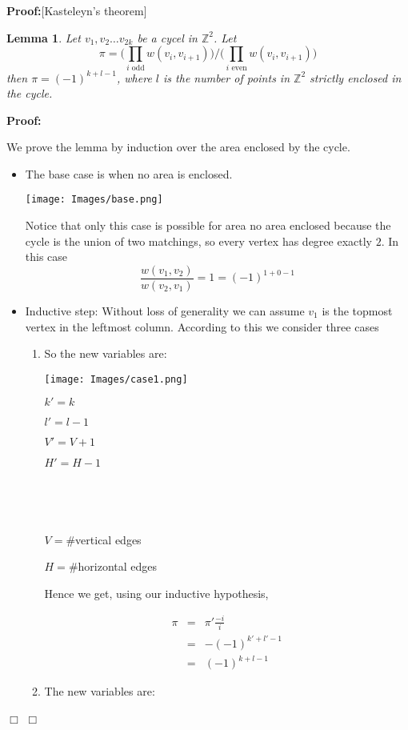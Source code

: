 \documentclass[11pt]{article}
\newtheorem{lemma}[theorem]{Lemma}
\newenvironment{proof}{\noindent \textbf{Proof:}}{$\Box$}
\begin{document}
\begin{proof}[Kasteleyn's theorem]
\begin{lemma}
Let $v_1,v_2\dots v_{2k}$ be a cycel in $\mathbb{Z}^2$. Let 
$$
\displaystyle \pi=\big({\prod_{i \text{ odd}} w(v_i,v_{i+1})}\big) / \big({\prod_{i \text{ even}}w(v_i,v_{i+1})}\big)
$$
then $\pi=(-1)^{k+l-1}$, where $l$ is the number of points in $\mathbb{Z}^2$ strictly enclosed in the cycle.
\end{lemma}

\begin{proof}

We prove the lemma by induction over the area enclosed by the cycle.
\begin{itemize}
\item The base case is when no area is enclosed.
    \begin{center}
 	\texttt{[image: Images/base.png]}
	\end{center}
Notice that only this case is possible for area no area enclosed because the cycle is the union of two matchings, so every vertex has degree exactly $2$. In this case
\[
\frac{w(v_1,v_2)}{w(v_2,v_1)}=1=(-1)^{1+0-1}
\]
\item Inductive step: Without loss of generality we can assume $v_1$ is the topmost vertex in the leftmost column. According to this we consider three cases
\begin{enumerate}
\item  So the new variables are:

\begin{multicols}{3}
\texttt{[image: Images/case1.png]}

$k'=k$

$l'=l-1$


$V'=V+1$ 

$H'=H-1$

\

\

$V= \#$vertical edges

$H= \#$horizontal edges

\end{multicols}

Hence we get, using our inductive hypothesis, 

\begin{eqnarray}
\pi	&=&	\pi' \frac{-i}{i}\\
	&=& -(-1)^{k'+l'-1}\\
	&=& (-1)^{k+l-1}
\end{eqnarray}


\item      	
	The new variables are:
	

\end{enumerate}
\end{itemize}
\end{proof}
\end{proof}
\end{document}

